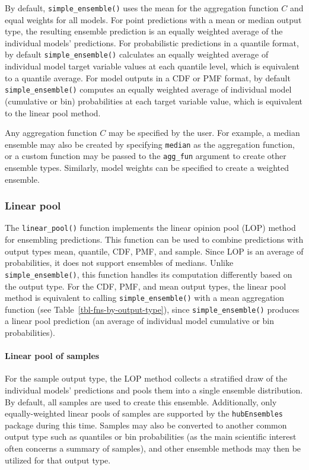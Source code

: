 \documentclass[
]{article}
\let\oldparagraph\paragraph
\renewcommand{\paragraph}[1]{\oldparagraph{#1}\mbox{}}
\begin{document}
By default, \texttt{simple\_ensemble()} uses the mean for the
aggregation function \(C\) and equal weights for all models. For point
predictions with a mean or median output type, the resulting ensemble
prediction is an equally weighted average of the individual models'
predictions. For probabilistic predictions in a quantile format, by
default \texttt{simple\_ensemble()} calculates an equally weighted
average of individual model target variable values at each quantile
level, which is equivalent to a quantile average. For model outputs in a
CDF or PMF format, by default \texttt{simple\_ensemble()} computes an
equally weighted average of individual model (cumulative or bin)
probabilities at each target variable value, which is equivalent to the
linear pool method.

Any aggregation function \(C\) may be specified by the user. For
example, a median ensemble may also be created by specifying
\texttt{median} as the aggregation function, or a custom function may be
passed to the \texttt{agg\_fun} argument to create other ensemble types.
Similarly, model weights can be specified to create a weighted ensemble.

\subsubsection{Linear pool}\label{sec-linear-pool}

The \texttt{linear\_pool()} function implements the linear opinion pool
(LOP) method for ensembling predictions. This function can be used to
combine predictions with output types mean, quantile, CDF, PMF, and
sample. Since LOP is an average of probabilities, it does not support
ensembles of medians. Unlike \texttt{simple\_ensemble()}, this function
handles its computation differently based on the output type. For the
CDF, PMF, and mean output types, the linear pool method is equivalent to
calling \texttt{simple\_ensemble()} with a mean aggregation function
(see Table~\ref{tbl-fns-by-output-type}), since
\texttt{simple\_ensemble()} produces a linear pool prediction (an
average of individual model cumulative or bin probabilities).

\paragraph{Linear pool of samples}\label{linear-pool-of-samples}

For the sample output type, the LOP method collects a stratified draw of
the individual models' predictions and pools them into a single ensemble
distribution. By default, all samples are used to create this ensemble.
Additionally, only equally-weighted linear pools of samples are
supported by the \texttt{hubEnsembles} package during this time. Samples
may also be converted to another common output type such as quantiles or
bin probabilities (as the main scientific interest often concerns a
summary of samples), and other ensemble methods may then be utilized for
that output type.
\end{document}
